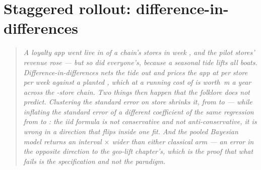 %
\chapter{Staggered rollout: difference-in-differences}
\label{ch:did}

\makeatletter
\newcommand{\refgeo}{\ifcsname r@ch:geo\endcsname\cref{ch:geo}\else the geo-lift chapter\fi}
\newcommand{\Refgeo}{\ifcsname r@ch:geo\endcsname\Cref{ch:geo}\else The geo-lift chapter\fi}
\makeatother

\begin{quote}\small
\emph{A loyalty app went live in \nbEightNTreated{} of a chain's \nbEightNStores{} stores in week
\nbEightLaunch, and the pilot stores' revenue rose --- but so did everyone's, because a seasonal
tide lifts all boats. Difference-in-differences nets the tide out and prices the app at
\eur{\nbEightAttCl} per store per week against a planted \eur{\nbEightTrueEffect}, which at a
running cost of \eur{\nbEightAppCost} is worth \eur{\nbEightAnnualMeanM}\,m a year across the
\nbEightNChain-store chain. Two things then happen that the folklore does not predict. Clustering
the standard error on store \emph{shrinks} it, from \eur{\nbEightAttIidSe} to
\eur{\nbEightAttClSe} --- while inflating the standard error of a different coefficient of the
same regression from \eur{\nbEightLvlIidSe} to \eur{\nbEightLvlClsSe}: the iid formula is not
conservative and not anti-conservative, it is wrong in a direction that flips inside one fit. And
the pooled Bayesian model returns an interval \nbEightBayesOverCluster$\times$ wider than either
classical arm --- an error in the \emph{opposite} direction to the geo-lift
chapter's, which is the proof that what fails is the specification and not the paradigm.}
\end{quote}

